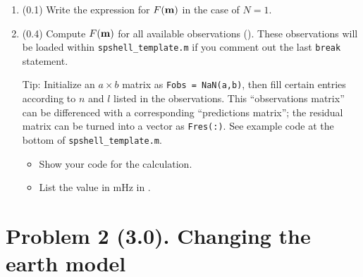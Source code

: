\documentclass[11pt,titlepage,fleqn]{article}
\begin{document}
\begin{enumerate}
\begin{enumerate}
\item (0.1) Write the expression for $F(\mbox{${\bf m}$})$ in the case of $N=1$.

\item (0.4) Compute $F(\mbox{${\bf m}$})$ for all available observations (). These observations will be loaded within \verb+spshell_template.m+ if you comment out the last \verb+break+ statement.

Tip: Initialize an $a \times b$ matrix as \verb+Fobs = NaN(a,b)+, then fill certain entries according to $n$ and $l$ listed in the observations. This ``observations matrix'' can be differenced with a corresponding ``predictions matrix''; the residual matrix can be turned into a vector as \verb+Fres(:)+. See example code at the bottom of \verb+spshell_template.m+.

\begin{itemize}
\item Show your code for the calculation.
\item List the value in mHz in .
\end{itemize}

\end{enumerate}

\label{prob:Fm}

\end{enumerate}


\section*{Problem 2 (3.0). Changing the earth model}
\end{document}

